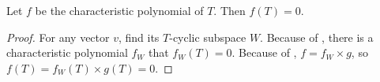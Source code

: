 \begin{theorem}
    Let $f$ be the characteristic polynomial of $T$. Then $f(T) = 0$.
\end{theorem}
\begin{proof}
    For any vector $v$, find its $T$-cyclic subspace $W$. Because of , there is a characteristic polynomial $f_W$ that $f_W(T) = 0$. Because of , $f = f_W \times g$, so $f(T) = f_W(T) \times g(T) = 0$.
\end{proof}












































